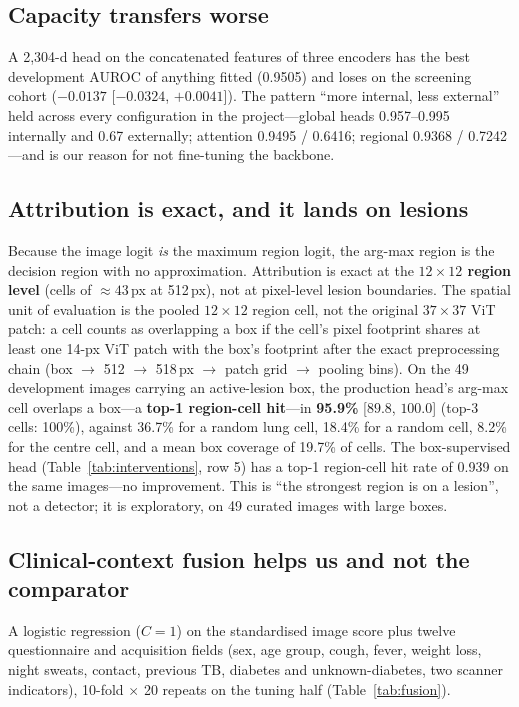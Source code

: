 \documentclass[11pt,a4paper]{article}
\newcommand{\ci}[2]{[$#1$, $#2$]}
\begin{document}
\subsection{Capacity transfers worse}
A 2,304-d head on the concatenated features of three encoders has the best development AUROC of anything fitted (0.9505) and loses on the screening cohort ($-0.0137$ \ci{-0.0324}{+0.0041}). The pattern ``more internal, less external'' held across every configuration in the project---global heads 0.957--0.995 internally and 0.67 externally; attention 0.9495 / 0.6416; regional 0.9368 / 0.7242---and is our reason for not fine-tuning the backbone.

\subsection{Attribution is exact, and it lands on lesions}\label{sec:loc}
Because the image logit \emph{is} the maximum region logit, the arg-max region is the decision region with no approximation. Attribution is exact at the \textbf{$12\times12$ region level} (cells of $\approx43$\,px at 512\,px), not at pixel-level lesion boundaries. The spatial unit of evaluation is the pooled $12\times12$ region cell, not the original $37\times37$ ViT patch: a cell counts as overlapping a box if the cell's pixel footprint shares at least one 14-px ViT patch with the box's footprint after the exact preprocessing chain (box $\to$ 512 $\to$ 518\,px $\to$ patch grid $\to$ pooling bins). On the 49 development images carrying an active-lesion box, the production head's arg-max cell overlaps a box---a \textbf{top-1 region-cell hit}---in \textbf{95.9\%} \ci{89.8}{100.0} (top-3 cells: 100\%), against 36.7\% for a random lung cell, 18.4\% for a random cell, 8.2\% for the centre cell, and a mean box coverage of 19.7\% of cells. The box-supervised head (Table~\ref{tab:interventions}, row 5) has a top-1 region-cell hit rate of 0.939 on the same images---no improvement. This is ``the strongest region is on a lesion'', not a detector; it is exploratory, on 49 curated images with large boxes.

\subsection{Clinical-context fusion helps us and not the comparator}\label{sec:fusion}
A logistic regression ($C=1$) on the standardised image score plus twelve questionnaire and acquisition fields (sex, age group, cough, fever, weight loss, night sweats, contact, previous TB, diabetes and unknown-diabetes, two scanner indicators), 10-fold $\times$ 20 repeats on the tuning half (Table~\ref{tab:fusion}).
\end{document}
